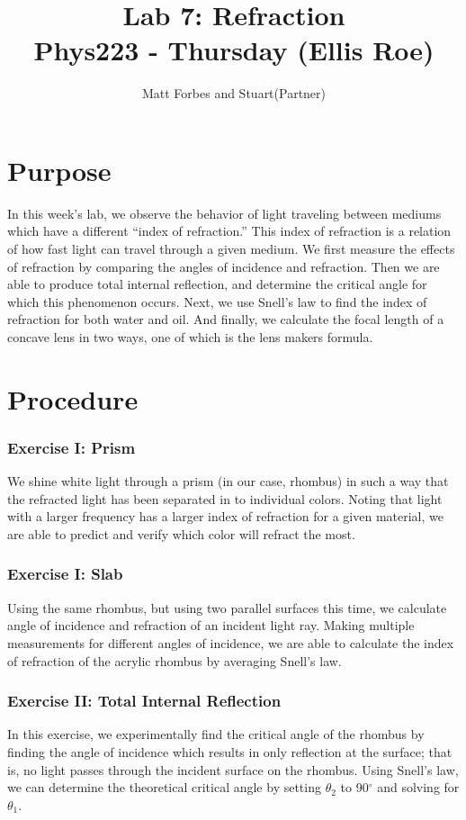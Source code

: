 \documentclass[12pt]{article}
\def \TITLE {Lab 7: Refraction\\ Phys223 - Thursday (Ellis Roe)}
\begin{document}
\onecolumn
\title{\TITLE}
\author{Matt Forbes and Stuart(Partner)}
\maketitle

\twocolumn
\section*{Purpose}
In this week's lab, we observe the behavior of light traveling between
mediums which have a different ``index of refraction.'' This index of
refraction is a relation of how fast light can travel through a given
medium. We first measure the effects of refraction by comparing the
angles of incidence and refraction. Then we are able to produce total
internal reflection, and determine the critical angle for which this
phenomenon occurs. Next, we use Snell's law to find the index of
refraction for both water and oil. And finally, we calculate the focal
length of a concave lens in two ways, one of which is the lens makers
formula.

\section*{Procedure}
\subsubsection*{Exercise I: Prism}
We shine white light through a prism (in our case, rhombus) in such a
way that the refracted light has been separated in to individual
colors. Noting that light with a larger frequency has a larger index
of refraction for a given material, we are able to predict and verify
which color will refract the most.

\subsubsection*{Exercise I: Slab}
Using the same rhombus, but using two parallel surfaces this time, we
calculate angle of incidence and refraction of an incident light
ray. Making multiple measurements for different angles of incidence,
we are able to calculate the index of refraction of the acrylic
rhombus by averaging Snell's law.

\subsubsection*{Exercise II: Total Internal Reflection}
In this exercise, we experimentally find the critical angle of the
rhombus by finding the angle of incidence which results in only
reflection at the surface; that is, no light passes through the
incident surface on the rhombus. Using Snell's law, we can determine
the theoretical critical angle by setting $\theta_2$ to 90$^{\circ}$
and solving for $\theta_1$.
\end{document}
